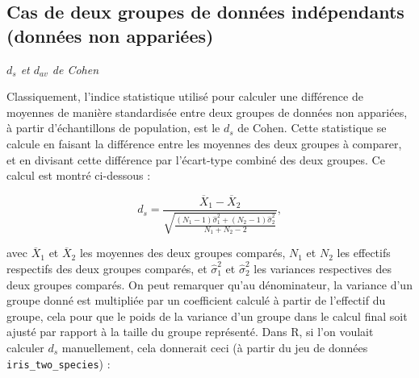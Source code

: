 \documentclass[
]{book}
\begin{document}
\hypertarget{cas-de-deux-groupes-de-donnuxe9es-induxe9pendants-donnuxe9es-non-appariuxe9es}{%
\subsection{Cas de deux groupes de données indépendants (données non appariées)}\label{cas-de-deux-groupes-de-donnuxe9es-induxe9pendants-donnuxe9es-non-appariuxe9es}}

\emph{\(d_{s}\) et \(d_{av}\) de Cohen}

Classiquement, l'indice statistique utilisé pour calculer une différence de moyennes de manière standardisée entre deux groupes de données non appariées, à partir d'échantillons de population, est le \(d_{s}\) de Cohen. Cette statistique se calcule en faisant la différence entre les moyennes des deux groupes à comparer, et en divisant cette différence par l'écart-type combiné des deux groupes. Ce calcul est montré ci-dessous :

\[d_{s} = \frac{\overline{X}_{1} - \overline{X}_{2}} {\sqrt{\frac{(N_{1} - 1) \hat{\sigma}_{1}^2 + (N_{2} - 1) \hat{\sigma}_{2}^2} {N_{1} + N_{2} - 2}}},\]

avec \(\overline{X}_{1}\) et \(\overline{X}_{2}\) les moyennes des deux groupes comparés, \(N_{1}\) et \(N_{2 }\) les effectifs respectifs des deux groupes comparés, et \(\hat{\sigma}_{1}^2\) et \(\hat{\sigma}_{2}^2\) les variances respectives des deux groupes comparés. On peut remarquer qu'au dénominateur, la variance d'un groupe donné est multipliée par un coefficient calculé à partir de l'effectif du groupe, cela pour que le poids de la variance d'un groupe dans le calcul final soit ajusté par rapport à la taille du groupe représenté. Dans R, si l'on voulait calculer \(d_s\) manuellement, cela donnerait ceci (à partir du jeu de données \texttt{iris\_two\_species}) :
\end{document}
